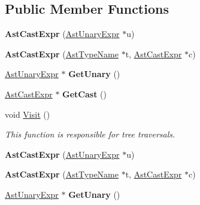 \subsection*{Public Member Functions}
\begin{DoxyCompactItemize}
\item 
\hypertarget{classAstCastExpr_a27857eebb48c3a153ddd4bebb0a5bc31}{{\bfseries Ast\-Cast\-Expr} (\hyperlink{classAstUnaryExpr}{Ast\-Unary\-Expr} $\ast$u)}\label{classAstCastExpr_a27857eebb48c3a153ddd4bebb0a5bc31}

\item 
\hypertarget{classAstCastExpr_a7a4384301ff0feb3c56fc6456792c416}{{\bfseries Ast\-Cast\-Expr} (\hyperlink{classAstTypeName}{Ast\-Type\-Name} $\ast$t, \hyperlink{classAstCastExpr}{Ast\-Cast\-Expr} $\ast$c)}\label{classAstCastExpr_a7a4384301ff0feb3c56fc6456792c416}

\item 
\hypertarget{classAstCastExpr_a85178306df5d2e1af2dca5a62ee2fab0}{\hyperlink{classAstUnaryExpr}{Ast\-Unary\-Expr} $\ast$ {\bfseries Get\-Unary} ()}\label{classAstCastExpr_a85178306df5d2e1af2dca5a62ee2fab0}

\item 
\hypertarget{classAstCastExpr_a8f5626c4848927c8695c6f6893a3393b}{\hyperlink{classAstCastExpr}{Ast\-Cast\-Expr} $\ast$ {\bfseries Get\-Cast} ()}\label{classAstCastExpr_a8f5626c4848927c8695c6f6893a3393b}

\item 
void \hyperlink{classAstCastExpr_a5c0f13da0e4bd315eb0e56c9cc9635e9}{Visit} ()
\begin{DoxyCompactList}\small\item\em This function is responsible for tree traversals. \end{DoxyCompactList}\item 
\hypertarget{classAstCastExpr_a27857eebb48c3a153ddd4bebb0a5bc31}{{\bfseries Ast\-Cast\-Expr} (\hyperlink{classAstUnaryExpr}{Ast\-Unary\-Expr} $\ast$u)}\label{classAstCastExpr_a27857eebb48c3a153ddd4bebb0a5bc31}

\item 
\hypertarget{classAstCastExpr_a7a4384301ff0feb3c56fc6456792c416}{{\bfseries Ast\-Cast\-Expr} (\hyperlink{classAstTypeName}{Ast\-Type\-Name} $\ast$t, \hyperlink{classAstCastExpr}{Ast\-Cast\-Expr} $\ast$c)}\label{classAstCastExpr_a7a4384301ff0feb3c56fc6456792c416}

\item 
\hypertarget{classAstCastExpr_a85178306df5d2e1af2dca5a62ee2fab0}{\hyperlink{classAstUnaryExpr}{Ast\-Unary\-Expr} $\ast$ {\bfseries Get\-Unary} ()}\label{classAstCastExpr_a85178306df5d2e1af2dca5a62ee2fab0}


\end{DoxyCompactItemize}
